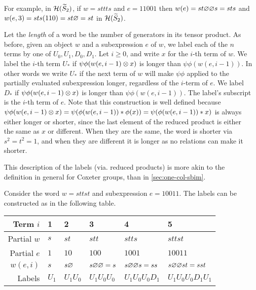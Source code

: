 For example, in $\mathcal{H}(\widetilde{S}_2)$, if $w = sttts$ and $e=11001$ then $w(e) = st \varnothing \varnothing s = sts$ and $w(e,3) = sts(110) = st\varnothing = st$ in $\mathcal{H}(\widetilde{S}_2)$.

Let the \textit{length} of a word be the number of generators in its tensor product. As before, given an object $w$ and a subexpression $e$ of $w$, we label each of the $n$ terms by one of $U_0, U_1, D_0, D_1$. Let $i \geq 0$, and write $x$ for the $i$-th term of $w$. We label the $i$-th term $U_*$ if $\psi\phi(w(e,i-1) \otimes x)$ is longer than $\psi\phi(w(e,i-1))$. In other words we write $U_*$ if the next term of $w$ will make $\psi\phi$ applied to the partially evaluated subexpression longer, regardless of the $i$-term of $e$. We label $D_*$ if $\psi\phi(w(e,i-1) \otimes x)$ is longer than $\psi\phi(w(e,i-1))$. The label's subscript is the $i$-th term of $e$. Note that this construction is well defined because $\psi\phi(w(e,i-1) \otimes x) = \psi(\phi(w(e,i-1)) * \phi(x)) = \psi(\phi(w(e,i-1)) * x)$ is always either longer or shorter, since the last element of the reduced product is either the same as $x$ or different. When they are the same, the word is shorter via $s^2 = t^2 = 1$, and when they are different it is longer as no relations can make it shorter.


\begin{remark}
    This description of the labels (via. reduced products) is more akin to the definition in general for Coxeter groups, than in \autoref{sec:one-col-sbim}.
\end{remark}

\begin{example}
    \label{eg:two-col-light-leaf-label}
    Consider the word $w = sttst$ and subexpression $e = 10011$. The labels can be constructed as in the following table.

    \begin{center}
        \begin{tabular}{ |r||l|l|l|l|l| }
            \hline
            Term $i$    & 1     & 2         & 3             & 4                 & 5                     \\ \hline
            Partial $w$ & $s$   & $st$      & $stt$         & $stts$            & $sttst$               \\ \hline
            Partial $e$ & $1$   & $10$      & $100$         & $1001$            & $10011$               \\ \hline
            $w(e,i)$    & $s$   & $s\varnothing$    & $s\varnothing\varnothing=s$   & $s\varnothing\varnothing s = ss$  & $s\varnothing\varnothing s t=sst$     \\ \hline
            Labels      & $U_1$ & $U_1 U_0$ & $U_1 U_0 U_0$ & $U_1 U_0 U_0 D_1$ & $U_1 U_0 U_0 D_1 U_1$ \\ \hline
        \end{tabular}
    \end{center}
\end{example}

